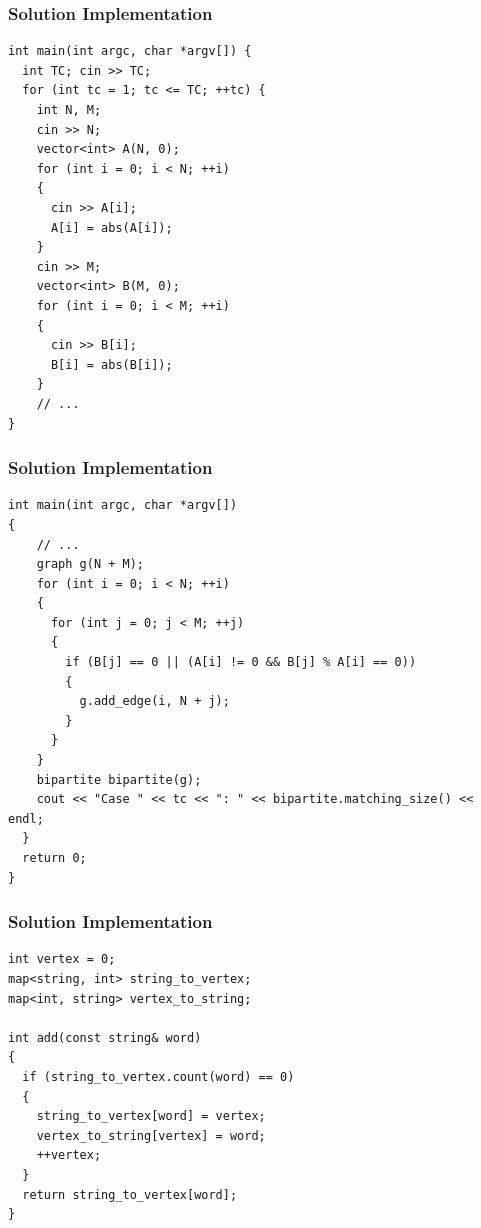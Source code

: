 \documentclass{beamer}
\newcommand{\codeforceslink}[2]{CodeForces (http://www.codeforces.com)
  problem: \href{#2}{\textcolor{blue}{#1}.}}
\newcounter{exo}
\newcommand{\exo}{
  \addtocounter{exo}{1}
  Exercice \arabic{exo}
}
\begin{document}
\ifanswers

\begin{frame}[containsverbatim]
\frametitle{Solution Implementation}
\scriptsize

\begin{lstlisting}
int main(int argc, char *argv[]) {
  int TC; cin >> TC;
  for (int tc = 1; tc <= TC; ++tc) {
    int N, M;
    cin >> N;
    vector<int> A(N, 0);
    for (int i = 0; i < N; ++i)
    {
      cin >> A[i];
      A[i] = abs(A[i]);
    }
    cin >> M;
    vector<int> B(M, 0);
    for (int i = 0; i < M; ++i)
    {
      cin >> B[i];
      B[i] = abs(B[i]);
    }
    // ...
}
\end{lstlisting}

\end{frame}

\begin{frame}[containsverbatim]
\frametitle{Solution Implementation}
\scriptsize

\begin{lstlisting}
int main(int argc, char *argv[])
{
    // ...
    graph g(N + M);
    for (int i = 0; i < N; ++i)
    {
      for (int j = 0; j < M; ++j)
      {
        if (B[j] == 0 || (A[i] != 0 && B[j] % A[i] == 0))
        {
          g.add_edge(i, N + j);
        }
      }
    }
    bipartite bipartite(g);
    cout << "Case " << tc << ": " << bipartite.matching_size() << endl;
  }
  return 0;
}
\end{lstlisting}

\end{frame}

\fi


\ifanswers

\begin{frame}[containsverbatim]
\frametitle{Solution Implementation}
\scriptsize

\begin{lstlisting}
int vertex = 0;
map<string, int> string_to_vertex;
map<int, string> vertex_to_string;

int add(const string& word)
{
  if (string_to_vertex.count(word) == 0)
  {
    string_to_vertex[word] = vertex;
    vertex_to_string[vertex] = word;
    ++vertex;
  }
  return string_to_vertex[word];
}
\end{lstlisting}

\end{frame}
\end{document}
